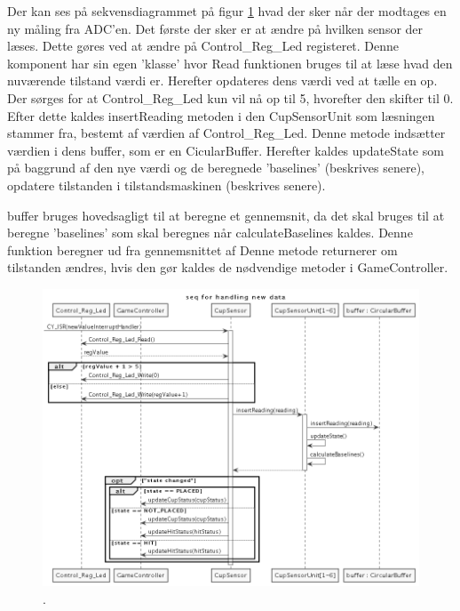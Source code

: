 \documentclass[Softwaredesign/Softwaredesign_main.tex]{subfiles}
\begin{document}
Der kan ses på sekvensdiagrammet på figur \ref{fig:CupSensor-IF-getting-reading} hvad der sker når der modtages en ny måling fra ADC'en. Det første der sker er at ændre på hvilken sensor der læses. Dette gøres ved at ændre på Control\_Reg\_Led registeret. Denne komponent har sin egen 'klasse' hvor Read funktionen bruges til at læse hvad den nuværende tilstand værdi er. Herefter opdateres dens værdi ved at tælle en op. Der sørges for at Control\_Reg\_Led kun vil nå op til 5, hvorefter den skifter til 0. 
Efter dette kaldes insertReading metoden i den CupSensorUnit som læsningen stammer fra, bestemt af værdien af Control\_Reg\_Led. Denne metode indsætter værdien i dens buffer, som er en CicularBuffer. Herefter kaldes updateState som på baggrund af den nye værdi og de beregnede 'baselines' (beskrives senere), opdatere tilstanden i tilstandsmaskinen (beskrives senere).  

buffer bruges hovedsagligt til at beregne et gennemsnit, da det skal bruges til at beregne 'baselines' som skal beregnes når calculateBaselines kaldes. Denne funktion beregner ud fra gennemsnittet af 
Denne metode returnerer om tilstanden ændres, hvis den gør kaldes de nødvendige metoder i GameController. 
\begin{figure}[H]
    \centering
    \includegraphics[width=1\textwidth]{Softwaredesign/CupSensor_IF/graphics/getting_reading.png}
    \caption{.}
    \label{fig:CupSensor-IF-getting-reading}
\end{figure}
\end{document}
